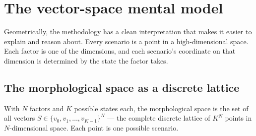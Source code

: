 \documentclass[11pt,a4paper]{article}
\begin{document}
\section{The vector-space mental model}

Geometrically, the methodology has a clean interpretation that makes it easier to explain and reason about. Every scenario is a point in a high-dimensional space. Each factor is one of the dimensions, and each scenario's coordinate on that dimension is determined by the state the factor takes.

\subsection{The morphological space as a discrete lattice}

With $N$ factors and $K$ possible states each, the morphological space is the set of all vectors $S \in \{v_0, v_1, \ldots, v_{K-1}\}^N$ — the complete discrete lattice of $K^N$ points in $N$-dimensional space. Each point is one possible scenario.
\end{document}
